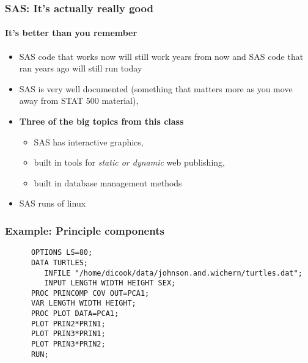 \documentclass[xcolor=dvipsnames,gray,mathserif]{beamer}
\begin{document}
\begin{frame}
   \frametitle{SAS: It's actually really good}
   \framesubtitle{It's better than you remember}
   \begin{itemize}
      \item SAS code that works now will still work years from now and SAS
         code that ran years ago will still run today 
         \vspace{.2cm}

      \item SAS is very well documented (something that matters 
            more as you move away from STAT 500 material),
         \vspace{.2cm}

         \item \textbf{Three of the big topics from this class}
            \begin{itemize}
               \item SAS has interactive graphics, \\
               \item built in tools for \textit{static or dynamic} web publishing, \\
               \item built in database management methods 
            \end{itemize}
         \vspace{.2cm}

         \item SAS runs of linux
   \end{itemize}
\end{frame}

\begin{frame}[fragile]
   \frametitle{Example: Principle components}
   \begin{verbatim}
      OPTIONS LS=80;
      DATA TURTLES;
         INFILE "/home/dicook/data/johnson.and.wichern/turtles.dat";
         INPUT LENGTH WIDTH HEIGHT SEX;
      PROC PRINCOMP COV OUT=PCA1;
      VAR LENGTH WIDTH HEIGHT;
      PROC PLOT DATA=PCA1;
      PLOT PRIN2*PRIN1;
      PLOT PRIN3*PRIN1;
      PLOT PRIN3*PRIN2;
      RUN;
   \end{verbatim}
\end{frame}
\end{document}
